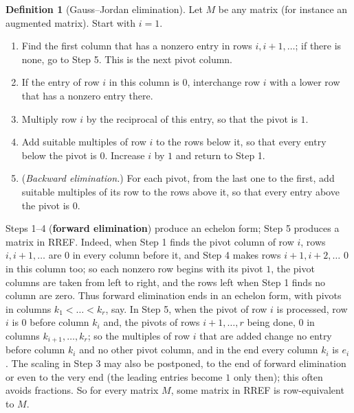 \documentclass[12pt]{article}
\theoremstyle{definition}
\newtheorem{definition}[theorem]{Definition}
\begin{document}
\begin{definition}[Gauss--Jordan elimination]\label{r2-def-gauss-jordan}
Let \(M\) be any matrix (for instance an augmented matrix). Start with \(i=1\).
\begin{enumerate}[label=\textit{Step \arabic*.},leftmargin=*]
\item Find the first column that has a nonzero entry in rows \(i,i+1,\dots\); if there is
none, go to Step 5. This is the next pivot column.
\item If the entry of row \(i\) in this column is \(0\), interchange row \(i\) with a lower row
that has a nonzero entry there.
\item Multiply row \(i\) by the reciprocal of this entry, so that the pivot is \(1\).
\item Add suitable multiples of row \(i\) to the rows below it, so that every entry below the
pivot is \(0\). Increase \(i\) by \(1\) and return to Step 1.
\item (\textit{Backward elimination.}) For each pivot, from the last one to the first, add
suitable multiples of its row to the rows above it, so that every entry above the pivot is
\(0\).
\end{enumerate}
Steps 1--4 (\textbf{forward elimination}) produce an echelon form; Step 5 produces a matrix in
RREF. Indeed, when Step 1 finds the pivot column of row \(i\), rows \(i,i+1,\dots\) are \(0\) in every column before
it, and Step 4 makes rows \(i+1,i+2,\dots\) \(0\) in this column too; so each nonzero row begins with its pivot \(1\),
the pivot columns are taken from left to right, and the rows left when Step 1 finds no column are zero. Thus forward
elimination ends in an echelon form, with pivots in columns \(k_1<\dots<k_r\), say. In Step 5, when the pivot of row
\(i\) is processed, row \(i\) is \(0\) before column \(k_i\) and, the pivots of rows \(i+1,\dots,r\) being done,
\(0\) in columns \(k_{i+1},\dots,k_r\); so the multiples of row \(i\) that are added change no entry before column
\(k_i\) and no other pivot column, and in the end every column \(k_i\) is \(e_i\). The scaling in Step 3 may also be
postponed, to the end of forward elimination or even to the very end (the leading entries become \(1\) only then);
this often avoids fractions. So for every matrix \(M\), some matrix in RREF is row-equivalent to \(M\).
\end{definition}
\end{document}
